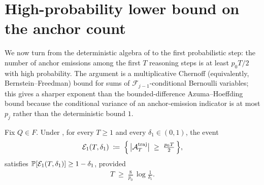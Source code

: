 \section{High-probability lower bound on the anchor count}
\label{sec:anchor_count}

We now turn from the deterministic algebra of
to the first probabilistic step: the number of anchor emissions among the
first $T$ reasoning steps is at least $p_0 T / 2$ with high probability.
The argument is a multiplicative Chernoff (equivalently, Bernstein--Freedman)
bound for sums of $\mathcal F_{j-1}$-conditional Bernoulli variables; this
gives a sharper exponent than the bounded-difference Azuma--Hoeffding
bound because the conditional variance of an anchor-emission indicator is
at most $p_j$ rather than the deterministic bound $1$.

\begin{lemma}\label{lem:anchor_count_lb}
Fix $Q \in F$. Under , for every $T \ge 1$
and every $\delta_1 \in (0, 1)$, the event
\begin{align}\label{eq:anchor_count_event}
   \mathcal{E}_1(T, \delta_1) \;\coloneqq\;
      \Big\{ \, \big| \mathcal A^{\mathrm{traj}}_T \big| \;\ge\; \tfrac{p_0 T}{2} \, \Big\},
\end{align}
satisfies $\mathbb{P}[\mathcal{E}_1(T, \delta_1)] \ge 1 - \delta_1$, provided
\begin{align}\label{eq:T_lower_bound_for_anchor_count}
   T \;\ge\; \frac{8}{p_0} \,\log\!\frac{1}{\delta_1}.
\end{align}
\end{lemma}

